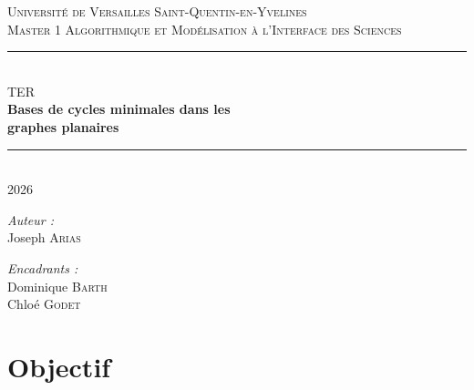 \documentclass{article}
\begin{document}
\begin{titlepage}
    \centering
    
    \textsc{\Large Université de Versailles Saint-Quentin-en-Yvelines}\\[0.5cm]
    \textsc{\large Master 1 Algorithmique et Modélisation à l'Interface des Sciences}\\[1.5cm]

    \rule{\linewidth}{0.3mm} \\[0.4cm]
    {\Huge TER} \\[0.4cm]
    {\Huge \bfseries Bases de cycles minimales dans les \\ [0.2cm] graphes planaires} \\[0.4cm]
    \rule{\linewidth}{0.3mm} \\[2cm]
    {\Huge 2026}

    \vfill

    \begin{minipage}{0.45\textwidth}
        \begin{flushleft} \large
            \emph{Auteur :}\\
            Joseph \textsc{Arias}
        \end{flushleft}
    \end{minipage}
    \hfill
    \begin{minipage}{0.45\textwidth}
        \begin{flushright} \large
            \emph{Encadrants :}\\
            Dominique \textsc{Barth} \\
            Chloé \textsc{Godet}
        \end{flushright}
    \end{minipage}    

\end{titlepage}
\newpage
\newpage
\tableofcontents
\newpage

\section{Objectif}
\end{document}
